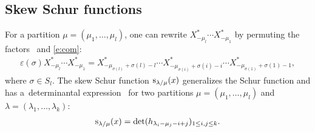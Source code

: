 \documentclass[pdftex]{sigma}
\numberwithin{equation}{section}
\begin{document}
\subsection{Skew Schur functions}
For a partition $\mu=(\mu_1,\dots,\mu_l)$, one can rewrite $X^*_{-\mu_l}\cdots X^*_{-\mu_1}$ by permuting the factors~\cite{Jing2000}
and \eqref{e:com}:
\begin{align}\label{e:sc5}
\varepsilon(\sigma)X^*_{-\mu_l}\cdots X^*_{-\mu_1}=X^*_{-\mu_{\sigma(l)}+\sigma(l)-l}\cdots X^*_{-\mu_{\sigma(i)}+\sigma(i)-i}\cdots X^*_{-\mu_{\sigma(1)}+\sigma(1)-1},
\end{align}
where $\sigma\in S_l$.
The skew Schur function ${\rm s}_{\lambda/\mu}(x)$ generalizes the Schur function and has a~determinantal expression~\cite[formula~(5.4)]{Mac1995} for two partitions $\mu=(\mu_1, \dots,\mu_l)$ and $\lambda=(\lambda_1, \dots,\lambda_k)$:
\begin{align*}
{\rm s}_{\lambda/\mu}(x)=\det(h_{\lambda_i-\mu_j-i+j})_{1\leq i,j\leq k}.
\end{align*}
\end{document}
